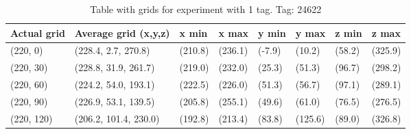 \begin{table}[] 
    \begin{tabular}{|l|l|l|l|l|l|l|l|}
        \hline
        Actual grid & Average grid (x,y,z)   & x min   & x max   & y min    & y max   & z min   & z max    \\ \hline
        (220, 0)     & (228.4, 2.7, 270.8)      & (210.8)     & (236.1)    & (-7.9)     & (10.2)      & (58.2)     & (325.9)    \\ \hline
        (220, 30)     & (228.8, 31.9, 261.7)      & (219.0)     & (232.0)    & (25.3)     & (51.3)      & (96.7)     & (298.2)    \\ \hline
        (220, 60)     & (224.2, 54.0, 193.1)      & (222.5)     & (226.0)    & (51.3)     & (56.7)      & (97.1)     & (289.1)    \\ \hline
        (220, 90)     & (226.9, 53.1, 139.5)      & (205.8)     & (255.1)    & (49.6)     & (61.0)      & (76.5)     & (276.5)    \\ \hline
        (220, 120)     & (206.2, 101.4, 230.0)      & (192.8)     & (213.4)    & (83.8)     & (125.6)      & (89.0)     & (326.8)    \\ \hline
    \end{tabular}
    \caption{Table with grids for experiment with 1 tag. Tag: 24622}
    \label{Tab:three-tag-experiment-result-tag-24622}
\end{table}